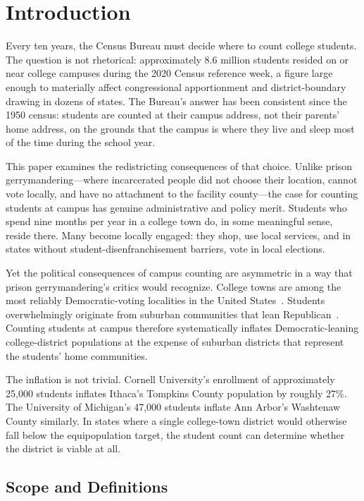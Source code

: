 \section{Introduction}
\label{sec:introduction}

Every ten years, the Census Bureau must decide where to count college students. The question is not rhetorical: approximately 8.6 million students resided on or near college campuses during the 2020 Census reference week, a figure large enough to materially affect congressional apportionment and district-boundary drawing in dozens of states. The Bureau's answer has been consistent since the 1950 census: students are counted at their campus address, not their parents' home address, on the grounds that the campus is where they live and sleep most of the time during the school year.

This paper examines the redistricting consequences of that choice. Unlike prison gerrymandering---where incarcerated people did not choose their location, cannot vote locally, and have no attachment to the facility county---the case for counting students at campus has genuine administrative and policy merit. Students who spend nine months per year in a college town do, in some meaningful sense, reside there. Many become locally engaged: they shop, use local services, and in states without student-disenfranchisement barriers, vote in local elections.

Yet the political consequences of campus counting are asymmetric in a way that prison gerrymandering's critics would recognize. College towns are among the most reliably Democratic-voting localities in the United States~\citep{rodden2019why}. Students overwhelmingly originate from suburban communities that lean Republican~\citep{levine2020college}. Counting students at campus therefore systematically inflates Democratic-leaning college-district populations at the expense of suburban districts that represent the students' home communities.

The inflation is not trivial. Cornell University's enrollment of approximately 25,000 students inflates Ithaca's Tompkins County population by roughly 27\%. The University of Michigan's 47,000 students inflate Ann Arbor's Washtenaw County similarly. In states where a single college-town district would otherwise fall below the equipopulation target, the student count can determine whether the district is viable at all.

\subsection{Scope and Definitions}

